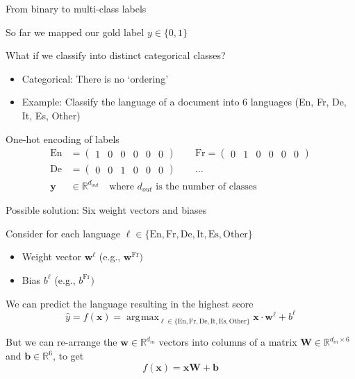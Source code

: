\documentclass[12pt,aspectratio=169,handout]{beamer}
\DeclareMathOperator*{\argmax}{arg\!\max}
\begin{document}
\begin{frame}{From binary to multi-class labels}
	
	So far we mapped our gold label $y \in \{0, 1\}$
	
	What if we classify into distinct categorical classes?
	
	\begin{itemize}
		\item Categorical: There is no `ordering'
		\item Example: Classify the language of a document into 6 languages (En, Fr, De, It, Es, Other)
	\end{itemize}
	
	\pause
	\begin{block}{One-hot encoding of labels}
		$$
		\begin{aligned}
			\text{En} &= \begin{pmatrix}1 & 0 & 0 & 0 & 0 & 0\end{pmatrix} \qquad
			\text{Fr} = \begin{pmatrix}0 & 1 & 0 & 0 & 0 & 0\end{pmatrix} \\
			\text{De} &= \begin{pmatrix}0 & 0 & 1 & 0 & 0 & 0\end{pmatrix} \qquad \ldots \\
			\bm{y} &\in \mathbb{R}^{d_{out}} \quad \text{where } d_{out} \text{ is the number of classes}
		\end{aligned}
		$$
	\end{block}
	
\end{frame}

\begin{frame}{Possible solution: Six weight vectors and biases}
	
	Consider for each language $\ell \in \{\text{En}, \text{Fr}, \text{De}, \text{It}, \text{Es}, \text{Other}\}$
	\begin{itemize}
		\item Weight vector $\bm{w}^{\ell}$ (e.g., $\bm{w}^{\text{Fr}})$
		\item Bias $b^{\ell}$ (e.g., $b^{\text{Fr}})$
	\end{itemize}
	\pause We can predict the language resulting in the highest score
	$$
	\hat{y} = f(\bm{x}) = \argmax_{
		\ell \in \{\text{En}, \text{Fr}, \text{De}, \text{It}, \text{Es}, \text{Other}\}
	}
	\bm{x} \cdot \bm{w}^{\ell} + b^{\ell}
	$$
	
	\pause
	But we can re-arrange the $\bm{w} \in \mathbb{R}^{d_{in}}$ vectors into columns of a matrix $\bm{W} \in \mathbb{R}^{d_{in} \times 6}$ and $\bm{b} \in \mathbb{R}^6$, to get
	$$f(\bm{x}) = \bm{x} \bm{W} + \bm{b}$$
	
\end{frame}
\end{document}
